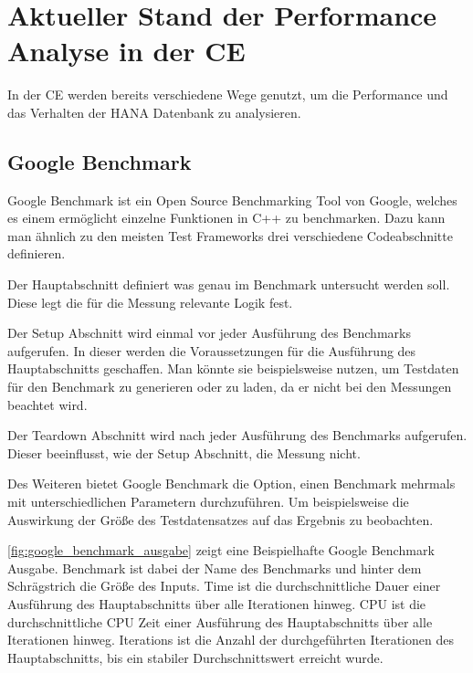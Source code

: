 \chapter{Aktueller Stand der Performance Analyse in der \acl{CE}}
In der \ac{CE} werden bereits verschiedene Wege genutzt, um die Performance und
das Verhalten der HANA Datenbank zu analysieren. 
\section{Google Benchmark}
\label{sec:google_benchmark}

Google Benchmark ist ein Open Source Benchmarking Tool von Google,
welches es einem ermöglicht einzelne Funktionen in C++ zu benchmarken. 
Dazu kann man ähnlich zu den meisten Test Frameworks drei verschiedene
Codeabschnitte definieren.

Der Hauptabschnitt definiert was genau im Benchmark untersucht werden
soll. Diese legt die für die Messung relevante Logik fest.

Der Setup Abschnitt wird einmal vor jeder Ausführung des Benchmarks
aufgerufen. In dieser werden die Voraussetzungen für die Ausführung des Hauptabschnitts
geschaffen. Man könnte sie beispielsweise nutzen, um Testdaten für den Benchmark
zu generieren oder zu laden, da er nicht bei den Messungen beachtet wird.

Der Teardown Abschnitt wird nach jeder Ausführung des Benchmarks aufgerufen.
Dieser beeinflusst, wie der Setup Abschnitt, die Messung nicht.

Des Weiteren bietet Google Benchmark die Option, einen Benchmark mehrmals mit
unterschiedlichen Parametern durchzuführen. Um beispielsweise die Auswirkung
der Größe des Testdatensatzes auf das Ergebnis zu beobachten.

\autoref{fig:google_benchmark_ausgabe} zeigt eine Beispielhafte Google
Benchmark Ausgabe. Benchmark ist dabei der Name des Benchmarks und hinter dem
Schrägstrich die Größe des Inputs. Time ist die durchschnittliche Dauer einer
Ausführung des Hauptabschnitts über alle Iterationen hinweg. CPU ist die
durchschnittliche CPU Zeit einer Ausführung des Hauptabschnitts über alle
Iterationen hinweg. Iterations ist die Anzahl der durchgeführten Iterationen
des Hauptabschnitts, bis ein stabiler Durchschnittswert erreicht wurde.
\autocite[Vgl.][]{GoogleBenchmark}

